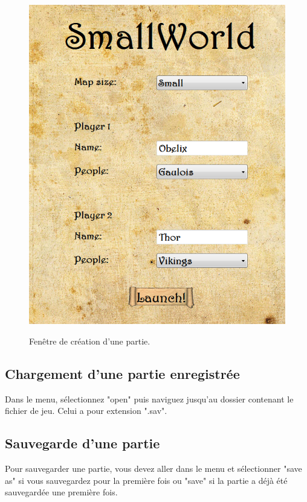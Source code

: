 \documentclass[a4paper,12pt]{article}
\begin{document}
\begin{figure}[H]
   \includegraphics[width=\textwidth]{create.png}
   \label{fig:create}
   \caption{Fenêtre de création d'une partie.}
\end{figure}
\FloatBarrier

\subsection{Chargement d'une partie enregistrée}
Dans le menu, sélectionnez "open" puis naviguez jusqu'au dossier contenant le fichier de jeu. Celui a pour extension ".sav".

\subsection{Sauvegarde d'une partie}
Pour sauvegarder une partie, vous devez aller dans le menu et sélectionner "save as" si vous sauvegardez pour la première fois ou "save" si la partie a déjà été sauvegardée une première fois.
\end{document}
